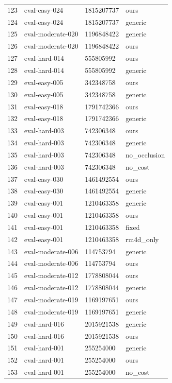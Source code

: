 \begin{tabular}{llll}
123 & eval-easy-024 & 1815207737 & ours \\
124 & eval-easy-024 & 1815207737 & generic \\
125 & eval-moderate-020 & 1196848422 & generic \\
126 & eval-moderate-020 & 1196848422 & ours \\
127 & eval-hard-014 & 555805992 & ours \\
128 & eval-hard-014 & 555805992 & generic \\
129 & eval-easy-005 & 342348758 & ours \\
130 & eval-easy-005 & 342348758 & generic \\
131 & eval-easy-018 & 1791742366 & ours \\
132 & eval-easy-018 & 1791742366 & generic \\
133 & eval-hard-003 & 742306348 & ours \\
134 & eval-hard-003 & 742306348 & generic \\
135 & eval-hard-003 & 742306348 & no\_occlusion \\
136 & eval-hard-003 & 742306348 & no\_cost \\
137 & eval-easy-030 & 1461492554 & ours \\
138 & eval-easy-030 & 1461492554 & generic \\
139 & eval-easy-001 & 1210463358 & generic \\
140 & eval-easy-001 & 1210463358 & ours \\
141 & eval-easy-001 & 1210463358 & fixed \\
142 & eval-easy-001 & 1210463358 & rm4d\_only \\
143 & eval-moderate-006 & 114753794 & generic \\
144 & eval-moderate-006 & 114753794 & ours \\
145 & eval-moderate-012 & 1778808044 & ours \\
146 & eval-moderate-012 & 1778808044 & generic \\
147 & eval-moderate-019 & 1169197651 & ours \\
148 & eval-moderate-019 & 1169197651 & generic \\
149 & eval-hard-016 & 2015921538 & generic \\
150 & eval-hard-016 & 2015921538 & ours \\
151 & eval-hard-001 & 255254000 & generic \\
152 & eval-hard-001 & 255254000 & ours \\
153 & eval-hard-001 & 255254000 & no\_cost \\

\end{tabular}
